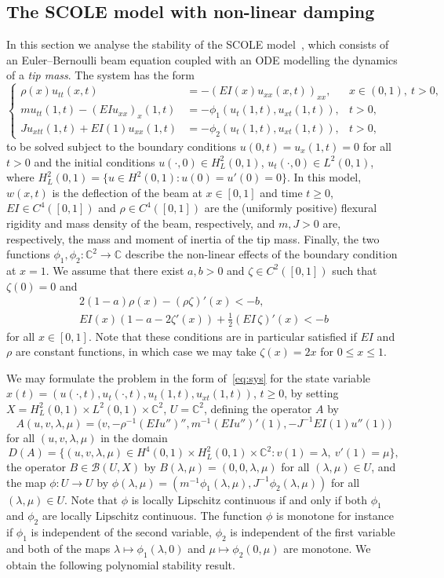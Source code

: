 \documentclass[11pt, a4paper]{amsart}
\newcommand{\B}{\mathcal{B}}
\newcommand{\CC}{\mathbb{C}}
\newcommand{\inv}{^{-1}}
\theoremstyle{definition}
\numberwithin{equation}{section}
\begin{document}
\subsection{The SCOLE model with non-linear damping}

In this section we analyse the stability of the SCOLE model~\cite{GuoIva05, TayBal88},
 which consists of an Euler--Bernoulli beam equation coupled with an ODE modelling the dynamics of a \emph{tip mass}.
The system has the form
$$
\left\{
\begin{aligned}
\rho(x)u_{tt}(x,t)&=-(E\!I(x)u_{xx}(x,t))_{xx}, &x\in(0,1),\ t>0,\\
mu_{tt}(1,t)-(E\!Iu_{xx})_x(1,t)&=-\phi_1(u_t(1,t),u_{xt}(1,t)), &t>0,\\
Ju_{xtt}(1,t)+E\!I(1)u_{xx}(1,t)&=-\phi_2(u_t(1,t),u_{xt}(1,t)), &t>0,
\end{aligned}
\right.$$
to be solved subject to the boundary conditions $u(0,t)=u_x(1,t)=0$ for all $t>0$ and the initial conditions  $u(\cdot,0)\in H_L^2(0,1)$, $u_t(\cdot,0)\in L^2(0,1)$, where $H_L^2(0,1)=\{u\in H^2(0,1) : u(0)=u'(0)=0\}$. In this model, $w(x,t)$ is the deflection of the beam at $x\in [0,1]$ and  time $t\ge 0$,  $E\!I\in C^4([0,1])$ and $\rho\in C^4([0,1])$ are the (uniformly positive) flexural rigidity and mass density of the beam, respectively, and $m,J>0$ are, respectively, the mass and moment of inertia of the tip mass. Finally, the two functions $\phi_1,\phi_2\colon \CC^2\to \CC$ describe the non-linear effects of the boundary condition at $x=1$. We assume that there exist $a,b>0$ and
$\zeta\in C^2([0,1])$ such that $\zeta(0)=0$ and
$$
\begin{aligned}
2(1-a)\rho(x)-(\rho\zeta)'(x)<-b,\\
E\!I(x)(1-a-2\zeta'(x))+\frac{1}{2}(E\!I\,\zeta)'(x)<-b
\end{aligned}$$
for all $x\in [0,1]$.
Note that these conditions are in particular satisfied if $E\!I$ and $\rho$ are constant functions, in which case we may take $\zeta(x) = 2x$ for $0\le x\le1$.

We  may formulate the problem in the form of~\eqref{eq:sys} for the state variable $x(t)=(u(\cdot,t),u_t(\cdot,t),u_t(1,t),u_{xt}(1,t))$, $t\ge0$,  by setting $X=H_L^2(0,1)\times L^2(0,1)\times\CC^2$,
 $U=\CC^2$, defining the operator $A$ by $$A(u,v,\lambda,\mu)=\big(v,-\rho\inv (E\!Iu'')'',m\inv (E\!Iu'')'(1), -J\inv E\!I(1)u''(1)\big)$$ for all $(u,v,\lambda,\mu)$ in the domain 
$$D(A) = \big\{(u,v,\lambda,\mu)\in H^4(0,1)\times H_L^2(0,1)\times \CC^2 : v(1)=\lambda, \ v'(1)= \mu \big\},$$ the operator $B\in \B(U,X)$ by $B(\lambda,\mu)=(0,0,\lambda,\mu)$ for all $(\lambda,\mu)\in U$, and the map $\phi\colon U\to U$ by $\phi(\lambda,\mu)=(m\inv\phi_1(\lambda,\mu),J\inv\phi_2(\lambda,\mu))$ for all $(\lambda,\mu)\in U$. Note that $\phi$ is locally Lipschitz continuous if and only if both $\phi_1$ and $\phi_2$ are locally Lipschitz continuous. The function $\phi$ is monotone for instance if $\phi_1$ is independent of the second variable, $\phi_2$ is independent of the first variable and both of the maps $\lambda\mapsto\phi_1(\lambda,0)$ and $ \mu\mapsto\phi_2(0,\mu)$ are monotone. We obtain the following polynomial stability result.
\end{document}
